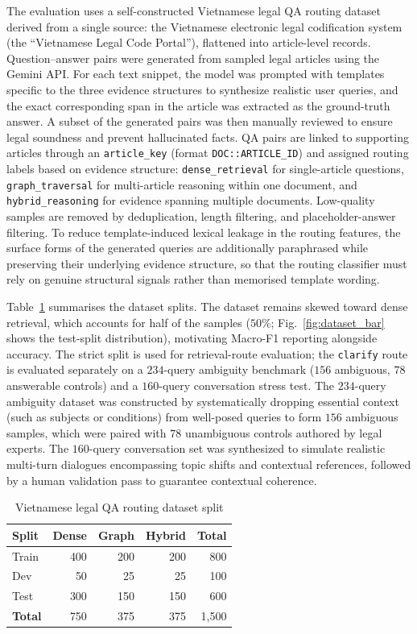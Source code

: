 \documentclass[pdflatex,sn-mathphys-num]{sn-jnl}
\begin{document}
The evaluation uses a self-constructed Vietnamese legal QA routing dataset
derived from a single source: the Vietnamese electronic legal codification
system (the ``Vietnamese Legal Code Portal''), flattened into article-level
records.
Question--answer pairs were generated from sampled legal articles using the
Gemini API. For each text snippet, the model was prompted with templates
specific to the three evidence structures to synthesize realistic user
queries, and the exact corresponding span in the article was extracted as the
ground-truth answer. A subset of the generated pairs was then manually
reviewed to ensure legal soundness and prevent hallucinated facts.
QA pairs are linked to supporting articles through an \texttt{article\_key}
(format \texttt{DOC::ARTICLE\_ID}) and assigned routing labels based on
evidence structure: \texttt{dense\_retrieval} for single-article questions,
\texttt{graph\_traversal} for multi-article reasoning within one document,
and \texttt{hybrid\_reasoning} for evidence spanning multiple documents.
Low-quality samples are removed by deduplication, length filtering, and
placeholder-answer filtering. To reduce template-induced lexical leakage in
the routing features, the surface forms of the generated queries are
additionally paraphrased while preserving their underlying evidence
structure, so that the routing classifier must rely on genuine structural
signals rather than memorised template wording.

Table~\ref{tab:dataset} summarises the dataset splits. The dataset remains
skewed toward dense retrieval, which accounts for half of the samples
($50\%$; Fig.~\ref{fig:dataset_bar} shows the test-split distribution),
motivating Macro-F1 reporting alongside accuracy. The strict split
is used for retrieval-route evaluation; the \texttt{clarify} route is
evaluated separately on a $234$-query ambiguity benchmark ($156$ ambiguous,
$78$ answerable controls) and a $160$-query conversation stress test.
The $234$-query ambiguity dataset was constructed by systematically dropping
essential context (such as subjects or conditions) from well-posed queries to
form $156$ ambiguous samples, which were paired with $78$ unambiguous
controls authored by legal experts. The $160$-query conversation set was
synthesized to simulate realistic multi-turn dialogues encompassing topic
shifts and contextual references, followed by a human validation pass to
guarantee contextual coherence.

\begin{table}[!htbp]
\centering
\caption{Vietnamese legal QA routing dataset split}\label{tab:dataset}
\begin{tabular}{lrrrr}
\toprule
\textbf{Split} & \textbf{Dense} & \textbf{Graph} & \textbf{Hybrid} & \textbf{Total} \\
\midrule
Train & 400 & 200 & 200 & 800 \\
Dev   & 50  & 25  & 25  & 100 \\
Test  & 300 & 150 & 150 & 600 \\
\midrule
\textbf{Total} & 750 & 375 & 375 & 1{,}500 \\
\bottomrule
\end{tabular}
\end{table}
\end{document}
